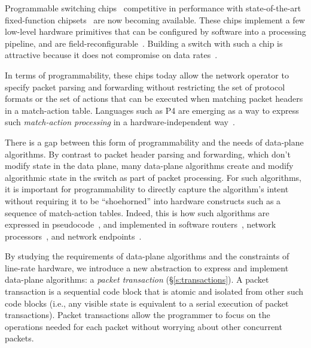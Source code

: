 Programmable switching chips~\cite{flexpipe, xpliant, rmt, corsa,
  uadp, algo_logic} competitive in performance with state-of-the-art
fixed-function chipsets~\cite{trident, tomahawk, mellanox} are now
becoming available. These chips implement a few low-level hardware
primitives that can be configured by software into a processing
pipeline, and are
field-reconfigurable~\cite{xpliant_sdk,xpliant_sdk2,intel_sdk}. Building
a switch with such a chip is attractive because it does not compromise
on data rates~\cite{rmt}.



In terms of programmability, these chips today allow the network
operator to specify packet parsing and forwarding without restricting
the set of protocol formats or the set of actions that can be executed
when matching packet headers in a match-action table. Languages such
as P4 are emerging as a way to express such {\em match-action
  processing} in a hardware-independent way~\cite{p4,p4spec,dc_p4}.

There is a gap between this form of programmability and the needs of
data-plane algorithms.
By contrast to packet header parsing and forwarding, which don't
modify state in the data plane, many data-plane algorithms create and
modify algorithmic state in the switch as part of packet
processing. For such algorithms, it is important for programmability
to directly capture the algorithm's intent without requiring it to be
``shoehorned'' into hardware constructs such as a sequence of
match-action tables. Indeed, this is how such algorithms are expressed
in pseudocode~\cite{red, csfq, codel_code, avq, blue}, and implemented
in software routers~\cite{click, dpdk, routebricks}, network
processors~\cite{packetc, nova}, and network endpoints~\cite{qdisc}.

By studying the requirements of data-plane algorithms and the
constraints of line-rate hardware, we introduce a new abstraction to
express and implement data-plane algorithms: a {\em packet
  transaction} (\S\ref{s:transactions}). A packet transaction is a
sequential code block that is atomic and isolated from other such code
blocks (i.e., any visible state is equivalent to a serial execution of
packet transactions). Packet transactions allow the programmer to
focus on the operations needed for each packet without worrying about
other concurrent packets.

